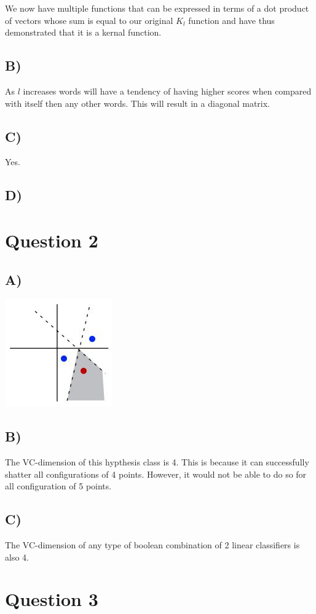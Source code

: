 \documentclass{report}
\begin{document}
We now have multiple functions that can
be expressed in terms of a dot product of vectors whose sum is equal to our original $K_l$
function and have thus demonstrated that it is a kernal function.

\subsection*{B)}
As $l$ increases words will have a tendency of having higher scores when compared
with itself then any other words. This will result in a diagonal matrix.
\subsection*{C)}
Yes.
\subsection*{D)}

\section*{Question 2}
\subsection*{A)}
\includegraphics[width=175px, keepaspectratio]{3points.jpg}
\subsection*{B)}
The VC-dimension of this hypthesis class is 4. This is because it can successfully
shatter all configurations of 4 points. However, it would not be able to do so for all
configuration of 5 points.
\subsection*{C)}
The VC-dimension of any type of boolean combination of 2 linear classifiers is
also 4.

\section*{Question 3}
\end{document}
